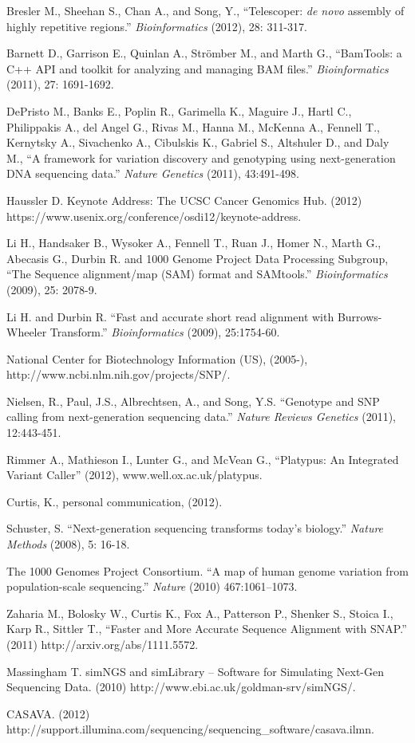 \documentclass[10pt]{article}
\begin{document}
\begin{thebibliography}{1}

 Bresler M., Sheehan S., Chan A., and Song, Y., ``Telescoper: {\it de novo} assembly of highly repetitive regions.'' {\em Bioinformatics} (2012), 28: 311-317.

 Barnett D., Garrison E., Quinlan A., Str\"{o}mber M., and Marth G., ``BamTools: a C++ API and toolkit for analyzing and managing BAM files.'' {\em Bioinformatics} (2011), 27: 1691-1692.

 DePristo M., Banks E., Poplin R., Garimella K., Maguire J., Hartl C., Philippakis A., del Angel G., Rivas M., Hanna M., McKenna A., Fennell T., Kernytsky A., Sivachenko A., Cibulskis K., Gabriel S., Altshuler D., and Daly M., ``A framework for variation discovery and genotyping using next-generation DNA sequencing data.'' {\em Nature Genetics} (2011), 43:491-498.

 Haussler D. Keynote Address: The UCSC Cancer Genomics Hub. (2012) https://www.usenix.org/conference/osdi12/keynote-address.

 Li H., Handsaker B., Wysoker A., Fennell T., Ruan J., Homer N., Marth G., Abecasis G., Durbin R. and 1000 Genome Project Data Processing Subgroup, ``The Sequence alignment/map (SAM) format and SAMtools.'' {\em Bioinformatics} (2009), 25: 2078-9.

 Li H. and Durbin R. ``Fast and accurate short read alignment with Burrows-Wheeler Transform.'' {\em Bioinformatics} (2009), 25:1754-60.

 National Center for Biotechnology Information (US), (2005-), http://www.ncbi.nlm.nih.gov/projects/SNP/.

 Nielsen, R., Paul, J.S., Albrechtsen, A., and Song, Y.S. ``Genotype and SNP calling from next-generation sequencing data.'' {\em Nature Reviews Genetics} (2011), 12:443-451. 

 Rimmer A., Mathieson I., Lunter G., and McVean G., ``Platypus: An Integrated Variant Caller'' (2012), www.well.ox.ac.uk/platypus.

 Curtis, K., personal communication, (2012).

 Schuster, S. ``Next-generation sequencing transforms today's biology.'' {\em Nature Methods} (2008), 5: 16-18.

 The 1000 Genomes Project Consortium. ``A map of human genome variation from population-scale sequencing.'' {\em Nature} (2010) 467:1061–1073.

 Zaharia M., Bolosky W., Curtis K., Fox A., Patterson P., Shenker S., Stoica I., Karp R., Sittler T., ``Faster and More Accurate Sequence Alignment with SNAP.'' (2011) http://arxiv.org/abs/1111.5572.

 Massingham T. simNGS and simLibrary -- Software for Simulating Next-Gen Sequencing Data. (2010) http://www.ebi.ac.uk/goldman-srv/simNGS/.

 CASAVA. (2012) http://support.illumina.com/sequencing/sequencing\_software/casava.ilmn.
\end{thebibliography}
\end{document}
